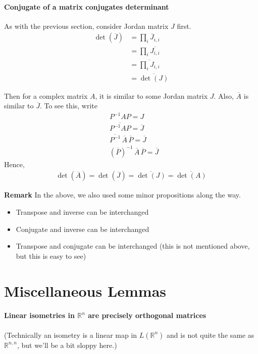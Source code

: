 \documentclass{article}
\begin{document}
\paragraph{Conjugate of a matrix conjugates determinant}
As with the previous section, consider Jordan matrix $J$ first.
\begin{align*}
	\det(\overline{J})
	&=\prod_i\overline{J}_{i,i}\\
	&=\prod_i\overline{J_{i,i}}\\
	&=\overline{\prod_iJ_{i,i}}\\
	&=\overline{\det(J)}
\end{align*}

Then for a complex matrix $A$, it is similar to some Jordan matrix $J$. Also, $\overline{A}$ is similar to $\overline{J}$.
To see this, write
\begin{align*}
	&P^{-1}AP=J\\
	&\overline{P^{-1}AP}=\overline{J}\\
	&\overline{P^{-1}}\,\overline{A}\,\overline{P}=\overline{J}\\
	&(\overline{P})^{-1}\, \overline{A}\, \overline{P}=\overline{J}
\end{align*}
Hence,
\begin{align*}
	\det(\overline{A}) = \det(\overline{J}) = \overline{\det(J)} = \overline{\det(A)}
\end{align*}

\textbf{Remark} In the above, we also used some minor propositions along the way. 
\begin{itemize}
	\item Transpose and inverse can be interchanged
	\item Conjugate and inverse can be interchanged
	\item Transpose and conjugate can be interchanged (this is not mentioned above, but this is easy to see)
\end{itemize}

\section{Miscellaneous Lemmas}
\paragraph{Linear isometries in $\mathbb{R}^n$ are precisely orthogonal matrices}
(Technically an isometry is a linear map in $L(\mathbb{R}^n)$ and is not quite the same as $\mathbb{R}^{n,n}$, but we'll be a bit sloppy here.)
\end{document}
